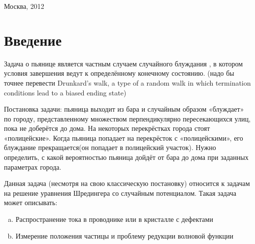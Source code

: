 \documentclass{article}
\begin{document}
\begin{titlepage}
        \vspace{10pt}
        
        \begin{center}
        \large{Москва, 2012}
        \end{center}
\end{titlepage}

\pagebreak
    
    
        
    \section{Введение}
        Задача о пьянице является частным случаем случайного блуждания \cite{wiki}, в котором условия завершения ведут к определённому конечному состоянию. (надо бы точнее перевести Drunkard's walk, a type of a random walk in which termination conditions lead to a biased ending state)

        Постановка задачи: пьяница выходит из бара и случайным образом «блуждает» по городу, представленному множеством перпендикулярно пересекающихся улиц, пока не доберётся до дома. На некоторых перекрёстках города стоят «полицейские». Когда пьяница попадает на перекрёсток с «полицейскими», его блуждание прекращается(он попадает в полицейский участок). Нужно определить, с какой вероятностью пьяница дойдёт от бара до дома при заданных параметрах города.

        Данная задача (несмотря на свою классическую постановку) относится к задачам на решение уравнения Шредингера со случайным потенциалом. Такая задача может описывать:
        \begin{enumerate}[a)]
            \item Распространение тока в проводнике или в кристалле с дефектами
            \item Измерение положения частицы и проблему редукции волновой функции
        \end{enumerate}
\end{document}
